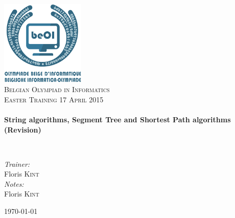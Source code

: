\begin{titlepage}
\begin{center}

\includegraphics[width=0.3\textwidth]{./img/beoi-logo}~\\[1cm]

\textsc{\LARGE Belgian Olympiad in Informatics}\\[1.5cm]

\textsc{\Large Easter Training 17 April 2015}\\[0.5cm]

\HRule \\[0.4cm]
{ \huge \bfseries String algorithms, Segment Tree and Shortest Path algorithms (Revision) \\[0.4cm] }

\HRule \\[1.5cm]

\begin{center} \large
\emph{Trainer:}\\
Floris \textsc{Kint}\\
\emph{Notes:}\\
Floris \textsc{Kint}
\end{center}

\vfill

{\large \today}

\end{center}
\end{titlepage}